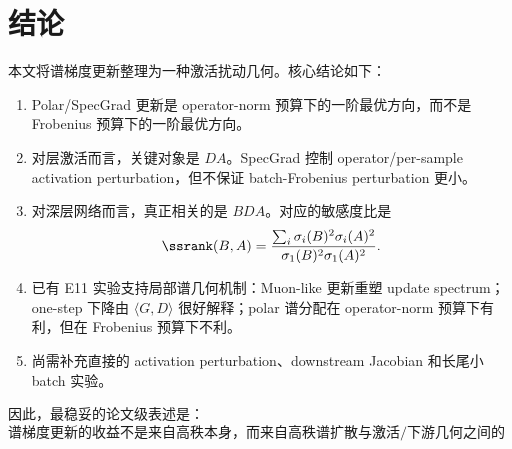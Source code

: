 \section{结论}

本文将谱梯度更新整理为一种激活扰动几何。核心结论如下：

\begin{enumerate}[label=(\arabic*)]
  \item Polar/SpecGrad 更新是 operator-norm 预算下的一阶最优方向，而不是 Frobenius 预算下的一阶最优方向。
  \item 对层激活而言，关键对象是 \(D A\)。SpecGrad 控制 operator/per-sample activation perturbation，但不保证 batch-Frobenius perturbation 更小。
  \item 对深层网络而言，真正相关的是 \(BDA\)。对应的敏感度比是
  \[
  \ssrank(B,A)=
  \frac{\sum_i \sigma_i(B)^2\sigma_i(A)^2}
  {\sigma_1(B)^2\sigma_1(A)^2}.
  \]
  \item 已有 E11 实验支持局部谱几何机制：Muon-like 更新重塑 update spectrum；one-step 下降由 \(\langle G,D\rangle\) 很好解释；polar 谱分配在 operator-norm 预算下有利，但在 Frobenius 预算下不利。
  \item 尚需补充直接的 activation perturbation、downstream Jacobian 和长尾小 batch 实验。
\end{enumerate}

因此，最稳妥的论文级表述是：
\[
\boxed{\text{谱梯度更新的收益不是来自高秩本身，而来自高秩谱扩散与激活/下游几何之间的匹配。}}
\]
